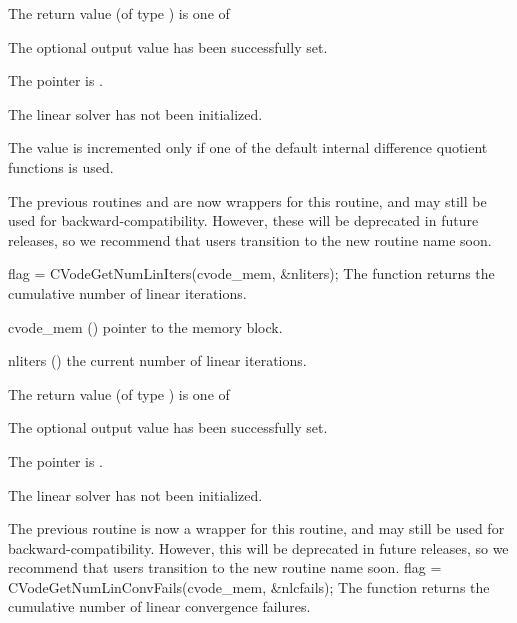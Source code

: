 {
  The return value  (of type ) is one of
  \begin{args}
  \item[\Id{CVLS\_SUCCESS}]
    The optional output value has been successfully set.
  \item[\Id{CVLS\_MEM\_NULL}]
    The  pointer is .
  \item[\Id{CVLS\_LMEM\_NULL}]
    The {\cvls} linear solver has not been initialized.
  \end{args}
}
{
  The value  is incremented only if one of the default
  internal difference quotient functions is used.

  The previous routines  and
   are now wrappers for this routine, and may
  still be used for backward-compatibility.  However, these will be
  deprecated in future releases, so we recommend that users transition
  to the new routine name soon.
}
{
  flag = CVodeGetNumLinIters(cvode\_mem, \&nliters);
}
{
  The function  returns the
  cumulative number of linear iterations.
}
{
  \begin{args}
  \item[cvode\_mem] ()
    pointer to the {\cvode} memory block.
  \item[nliters] ()
    the current number of linear iterations.
  \end{args}
}
{
  The return value  (of type ) is one of
  \begin{args}
  \item[\Id{CVLS\_SUCCESS}]
    The optional output value has been successfully set.
  \item[\Id{CVLS\_MEM\_NULL}]
    The  pointer is .
  \item[\Id{CVLS\_LMEM\_NULL}]
    The {\cvls} linear solver has not been initialized.
  \end{args}
}
{
  The previous routine  is now a wrapper for
  this routine, and may still be used for backward-compatibility.
  However, this will be deprecated in future releases, so we recommend
  that users transition to the new routine name soon.
}
{
  flag = CVodeGetNumLinConvFails(cvode\_mem, \&nlcfails);
}
{
  The function  returns the
  cumulative number of linear convergence failures.
}
